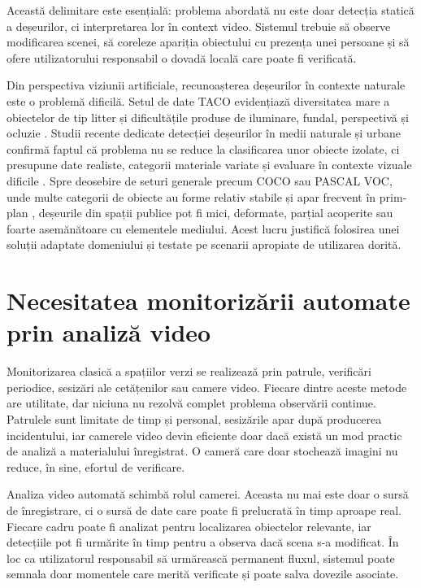 Această delimitare este esențială: problema abordată nu este doar detecția statică a deșeurilor, ci interpretarea lor în context video. Sistemul trebuie să observe modificarea scenei, să coreleze apariția obiectului cu prezența unei persoane și să ofere utilizatorului responsabil o dovadă locală care poate fi verificată.

Din perspectiva viziunii artificiale, recunoașterea deșeurilor în contexte naturale este o problemă dificilă. Setul de date TACO evidențiază diversitatea mare a obiectelor de tip litter și dificultățile produse de iluminare, fundal, perspectivă și ocluzie \cite{proenca2020taco}. Studii recente dedicate detecției deșeurilor în medii naturale și urbane confirmă faptul că problema nu se reduce la clasificarea unor obiecte izolate, ci presupune date realiste, categorii materiale variate și evaluare în contexte vizuale dificile \cite{majchrowska2022waste}. Spre deosebire de seturi generale precum COCO sau PASCAL VOC, unde multe categorii de obiecte au forme relativ stabile și apar frecvent în prim-plan \cite{lin2014microsoft}, deșeurile din spații publice pot fi mici, deformate, parțial acoperite sau foarte asemănătoare cu elementele mediului. Acest lucru justifică folosirea unei soluții adaptate domeniului și testate pe scenarii apropiate de utilizarea dorită.

\section{Necesitatea monitorizării automate prin analiză video}

Monitorizarea clasică a spațiilor verzi se realizează prin patrule, verificări periodice, sesizări ale cetățenilor sau camere video. Fiecare dintre aceste metode are utilitate, dar niciuna nu rezolvă complet problema observării continue. Patrulele sunt limitate de timp și personal, sesizările apar după producerea incidentului, iar camerele video devin eficiente doar dacă există un mod practic de analiză a materialului înregistrat. O cameră care doar stochează imagini nu reduce, în sine, efortul de verificare.

Analiza video automată schimbă rolul camerei. Aceasta nu mai este doar o sursă de înregistrare, ci o sursă de date care poate fi prelucrată în timp aproape real. Fiecare cadru poate fi analizat pentru localizarea obiectelor relevante, iar detecțiile pot fi urmărite în timp pentru a observa dacă scena s-a modificat. În loc ca utilizatorul responsabil să urmărească permanent fluxul, sistemul poate semnala doar momentele care merită verificate și poate salva dovezile asociate.


